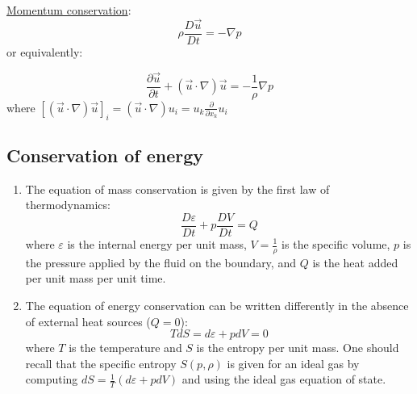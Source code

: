 ﻿\documentclass[11pt]{article}
\begin{document}
  \underline{Momentum conservation}:
  \begin{equation}
    \rho \frac{D\vec{u}}{Dt} = -\nabla p
  \end{equation}
  or equivalently:
  
  \begin{equation}
     \frac{\partial \vec{u}}{\partial t} + (\vec{u} \cdot \nabla) \vec{u} = -\frac{1}{\rho}\nabla p
  \end{equation}
  where $[(\vec{u} \cdot \nabla)\vec{u}]_i = (\vec{u} \cdot \nabla)u_i = u_k \frac{\partial}{\partial x_k} u_i$


\subsection{Conservation of energy}
\begin{enumerate}
    \item The equation of mass conservation is given by the first law of thermodynamics:
    \begin{equation}
      \frac{D\varepsilon}{Dt} + p \frac{DV}{Dt} = Q
    \end{equation}
    where $\varepsilon$ is the internal energy per unit mass, $V=\frac{1}{\rho}$ is the specific volume, $p$ is the pressure applied by the fluid on the boundary, and $Q$ is the heat added per unit mass per unit time.
    \item The equation of energy conservation can be written differently in the absence of external heat sources ($Q=0$):
    \begin{equation}
      T dS = d\varepsilon + p dV = 0
    \end{equation}
    where $T$ is the temperature and $S$ is the entropy per unit mass. \newline
    One should recall that the specific entropy $S(p,\rho)$ is given for an ideal gas by computing $dS = \frac{1}{T}(d\varepsilon + p dV)$ and using the ideal gas equation of state.
  \end{enumerate}
\end{document}
